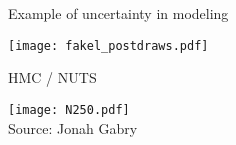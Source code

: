 \documentclass[finnish,english,t]{beamer}
\begin{document}





\begin{frame}

  {\large\color{navyblue} Example of uncertainty in modeling}

  \texttt{[image: fakel\_postdraws.pdf]}

\end{frame}

\begin{frame}{HMC / NUTS}

  \vspace{-.5\baselineskip}
  \texttt{[image: N250.pdf]}\\
  Source: Jonah Gabry

\end{frame}




\end{document}
